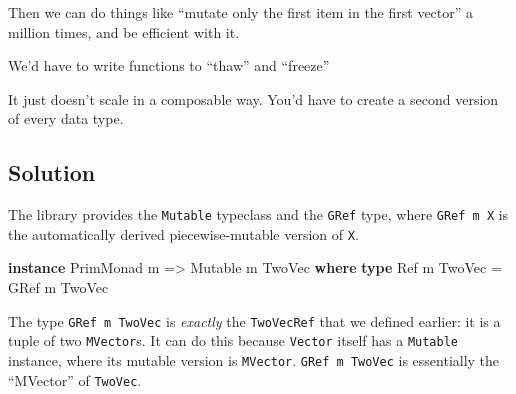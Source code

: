 \documentclass[]{article}
\newenvironment{Shaded}{}{}
\newcommand{\DataTypeTok}[1]{\textcolor[rgb]{0.56,0.13,0.00}{#1}}
\newcommand{\KeywordTok}[1]{\textcolor[rgb]{0.00,0.44,0.13}{\textbf{#1}}}
\newcommand{\NormalTok}[1]{#1}
\newcommand{\OperatorTok}[1]{\textcolor[rgb]{0.40,0.40,0.40}{#1}}
\newcommand{\OtherTok}[1]{\textcolor[rgb]{0.00,0.44,0.13}{#1}}
\begin{document}
Then we can do things like ``mutate only the first item in the first vector'' a
million times, and be efficient with it.

We'd have to write functions to ``thaw'' and ``freeze''

\begin{Shaded}
\end{Shaded}

It just doesn't scale in a composable way. You'd have to create a second version
of every data type.

\hypertarget{solution}{%
\subsection{Solution}\label{solution}}

The library provides the \texttt{Mutable} typeclass and the \texttt{GRef} type,
where \texttt{GRef\ m\ X} is the automatically derived piecewise-mutable version
of \texttt{X}.

\begin{Shaded}
\begin{Highlighting}[]
\KeywordTok{instance} \DataTypeTok{PrimMonad}\NormalTok{ m }\OtherTok{=>} \DataTypeTok{Mutable}\NormalTok{ m }\DataTypeTok{TwoVec} \KeywordTok{where}
    \KeywordTok{type} \DataTypeTok{Ref}\NormalTok{ m }\DataTypeTok{TwoVec} \OtherTok{=} \DataTypeTok{GRef}\NormalTok{ m }\DataTypeTok{TwoVec}
\end{Highlighting}
\end{Shaded}

The type \texttt{GRef\ m\ TwoVec} is \emph{exactly} the \texttt{TwoVecRef} that
we defined earlier: it is a tuple of two \texttt{MVector}s. It can do this
because \texttt{Vector} itself has a \texttt{Mutable} instance, where its
mutable version is \texttt{MVector}. \texttt{GRef\ m\ TwoVec} is essentially the
``MVector'' of \texttt{TwoVec}.
\end{document}
